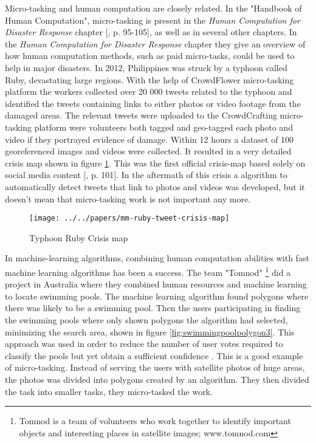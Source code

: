 Micro-tasking and human computation are closely related. In the "Handbook of Human Computation", micro-tasking is present in the \textit{Human Computation for Disaster Response} chapter [\citep{Meier2013}, p. 95-105], as well as in several other chapters. In the \textit{Human Computation for Disaster Response} chapter they give an overview of how human computation methods, such as paid micro-tasks, could be used to help in major disasters. In 2012, Philippines was struck by a typhoon called Ruby, devastating large regions. With the help of CrowdFlower micro-tasking platform the workers collected over 20 000 tweets related to the typhoon and identified the tweets containing links to either photos or video footage from the damaged areas. The relevant tweets were uploaded to the CrowdCrafting micro-tasking platform were volunteers both tagged and geo-tagged each photo and video if they portrayed evidence of damage. Within 12 hours a dataset of 100 georeferenced images and videos were collected. It resulted in a very detailed crisis map shown in figure \ref{fig:mm-ruby-tweet-crisis-map}. This was the first official crisis-map based solely on social media content [\citep{Meier2013}, p. 101]. In the aftermath of this crisis a algorithm to automatically detect tweets that link to photos and videos was developed, but it doesn't mean that micro-tasking work is not important any more. 

\begin{figure}[H]
	\centering
	\texttt{[image: ../../papers/mm-ruby-tweet-crisis-map]}
	\caption{Typhoon Ruby Crisis map \citep{Meier2014}}
	\label{fig:mm-ruby-tweet-crisis-map}
\end{figure}

In machine-learning algorithms, combining human computation abilities with fast machine learning algorithms has been a success. The team "Tomnod" \footnote{Tomnod is a team of volunteers who work together to identify important objects and interesting places in satellite images; www.tomnod.com} did a project in Australia where they combined human resources and machine learning to locate swimming pools. The machine learning algorithm found polygons where there was likely to be a swimming pool. Then the users participating in finding the swimming pools where only shown polygons the algorithm had selected, minimizing the search area, shown in figure \ref{fig:swimmingpoolpolygon3}. This approach was used in order to reduce the number of user votes required to classify the pools but yet obtain a sufficient confidence \citep{Kostas2016}. This is a good example of micro-tasking. Instead of serving the users with satellite photos of huge areas, the photos was divided into polygons created by an algorithm. They then divided the task into smaller tasks, they micro-tasked the work. 

